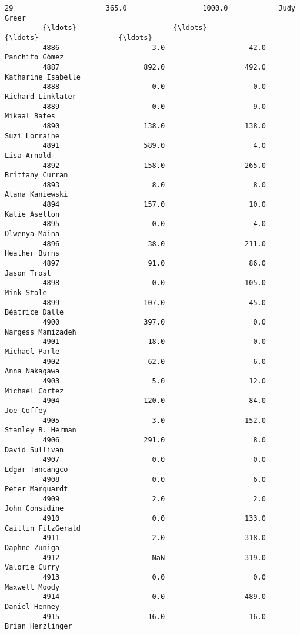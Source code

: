 \documentclass[11pt]{article}
\begin{document}
\begin{Verbatim}[commandchars=\\\{\}]
         29                      365.0                  1000.0            Judy Greer   
         {\ldots}                       {\ldots}                     {\ldots}                   {\ldots}   
         4886                      3.0                    42.0        Panchito Gómez   
         4887                    892.0                   492.0    Katharine Isabelle   
         4888                      0.0                     0.0     Richard Linklater   
         4889                      0.0                     9.0          Mikaal Bates   
         4890                    138.0                   138.0         Suzi Lorraine   
         4891                    589.0                     4.0           Lisa Arnold   
         4892                    158.0                   265.0       Brittany Curran   
         4893                      8.0                     8.0       Alana Kaniewski   
         4894                    157.0                    10.0         Katie Aselton   
         4895                      0.0                     4.0         Olwenya Maina   
         4896                     38.0                   211.0         Heather Burns   
         4897                     91.0                    86.0           Jason Trost   
         4898                      0.0                   105.0            Mink Stole   
         4899                    107.0                    45.0        Béatrice Dalle   
         4900                    397.0                     0.0     Nargess Mamizadeh   
         4901                     18.0                     0.0         Michael Parle   
         4902                     62.0                     6.0         Anna Nakagawa   
         4903                      5.0                    12.0        Michael Cortez   
         4904                    120.0                    84.0            Joe Coffey   
         4905                      3.0                   152.0     Stanley B. Herman   
         4906                    291.0                     8.0        David Sullivan   
         4907                      0.0                     0.0       Edgar Tancangco   
         4908                      0.0                     6.0       Peter Marquardt   
         4909                      2.0                     2.0        John Considine   
         4910                      0.0                   133.0    Caitlin FitzGerald   
         4911                      2.0                   318.0         Daphne Zuniga   
         4912                      NaN                   319.0         Valorie Curry   
         4913                      0.0                     0.0         Maxwell Moody   
         4914                      0.0                   489.0         Daniel Henney   
         4915                     16.0                    16.0      Brian Herzlinger   
         

\end{Verbatim}
\end{document}
